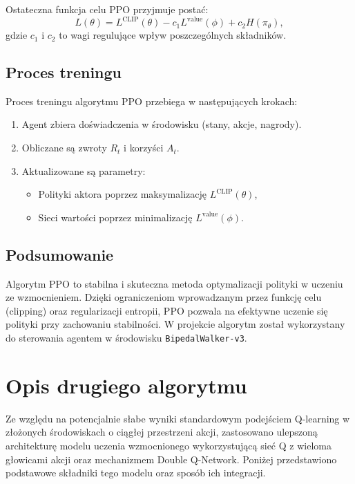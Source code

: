 \documentclass[conference]{IEEEtran}
\begin{document}
Ostateczna funkcja celu PPO przyjmuje postać:
\begin{equation}
L(\theta) = L^\text{CLIP}(\theta) - c_1 L^\text{value}(\phi) + c_2 H(\pi_\theta),
\end{equation}
gdzie \(c_1\) i \(c_2\) to wagi regulujące wpływ poszczególnych składników.

\subsection{Proces treningu}
Proces treningu algorytmu PPO przebiega w następujących krokach:
\begin{enumerate}
    \item Agent zbiera doświadczenia w środowisku (stany, akcje, nagrody).
    \item Obliczane są zwroty \(R_t\) i korzyści \(A_t\).
    \item Aktualizowane są parametry:
    \begin{itemize}
        \item Polityki aktora poprzez maksymalizację \(L^\text{CLIP}(\theta)\),
        \item Sieci wartości poprzez minimalizację \(L^\text{value}(\phi)\).
    \end{itemize}
\end{enumerate}

\subsection{Podsumowanie}
Algorytm PPO to stabilna i skuteczna metoda optymalizacji polityki w uczeniu ze wzmocnieniem. Dzięki ograniczeniom wprowadzanym przez funkcję celu (clipping) oraz regularizacji entropii, PPO pozwala na efektywne uczenie się polityki przy zachowaniu stabilności. W projekcie algorytm został wykorzystany do sterowania agentem w środowisku \texttt{BipedalWalker-v3}.

\section{Opis drugiego algorytmu}

Ze względu na potencjalnie słabe wyniki standardowym podejściem Q-learning w złożonych środowiskach o ciągłej przestrzeni akcji, zastosowano ulepszoną architekturę modelu uczenia wzmocnionego wykorzystującą sieć Q z wieloma głowicami akcji oraz mechanizmem Double Q-Network. Poniżej przedstawiono podstawowe składniki tego modelu oraz sposób ich integracji.
\end{document}

